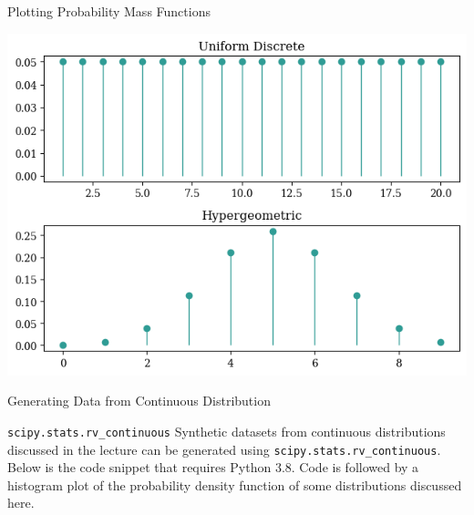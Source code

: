 \documentclass[aspectratio=169,xcolor=dvipsnames,svgnames,x11names,fleqn]{beamer}
\begin{document}
    \begin{frame}[containsverbatim]{Plotting Probability Mass Functions}
    \begin{center}
        \includegraphics[height=.6\textheight]{figures/PMFs.png}
    
    \end{center}
    \end{frame}
    
    
    \begin{frame}[containsverbatim]{Generating Data from Continuous Distribution}
    \begin{gradblock}{\texttt{scipy.stats.rv\_continuous}}
        Synthetic datasets from continuous distributions discussed in the lecture can be generated using \texttt{scipy.stats.rv\_continuous}. Below is the code snippet that requires Python 3.8. Code is followed by a histogram plot of the probability density function of some distributions discussed here.
    \end{gradblock}
\end{frame}
    

    
\end{document}
